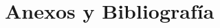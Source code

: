 \documentclass[twoside,openright,titlepage,numbers=noenddot,headinclude,%
                footinclude=true,cleardoublepage=empty,abstractoff, %
                BCOR=5mm,paper=b5paper,b5paper,fontsize=11pt,%
                dottedtoc
                ]{scrreprt}
\begin{document}
\part{Anexos y Bibliograf\'ia}

%

\cleardoublepage
\cleardoublepage
\end{document}

